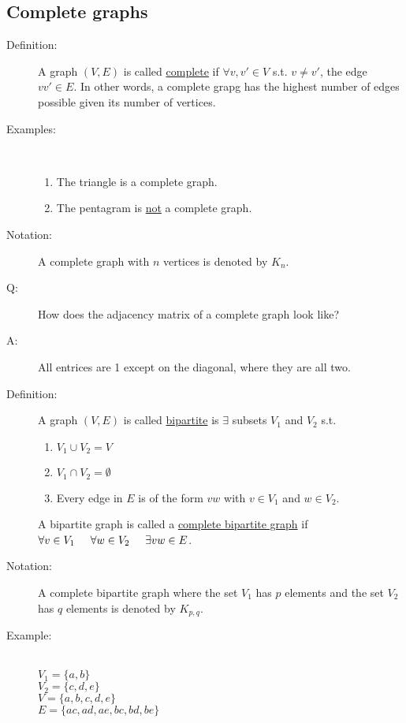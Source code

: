 \documentclass[10pt]{article}
\begin{document}
	\subsection{Complete graphs}
	\begin{description}
		\item[Definition:] A graph $(V, E)$ is called \underline{complete} if $\forall v, v' \in V$ s.t. $v \neq v'$, the edge $vv' \in E$. In other words, a complete grapg has the highest number of edges possible given its number of vertices.
		\item[Examples:] ~\\
		\begin{enumerate}
			\item The triangle is a complete graph.
			\item The pentagram is \underline{not} a complete graph.
		\end{enumerate}
		\item[Notation:] A complete graph with $n$ vertices is denoted by $K_n$.
		\item[Q:] How does the adjacency matrix of a complete graph look like?
		\item[A:] All entrices are 1 except on the diagonal, where they are all two.
		\item[Definition:] A graph $(V, E)$ is called \underline{bipartite} is $\exists$ subsets $V_1$ and $V_2$ s.t.
		\begin{enumerate}
			\item $V_1 \cup V_2 = V$
			\item $V_1 \cap V_2 = \emptyset$
			\item Every edge in $E$ is of the form $vw$ with $v \in V_1$ and $w \in V_2$.
		\end{enumerate}
		A bipartite graph is called a \underline{complete bipartite graph} if $\forall v \in V_1 \hspace{5mm} \forall w \in V_2 \hspace{5mm} \exists vw \in E$.
		\item[Notation:] A complete bipartite graph where the set $V_1$ has $p$ elements and the set $V_2$ has $q$ elements is denoted by $K_{p,q}$.
		\item[Example:] ~\\
		$V_1 = \{a, b\}$ \\
		$V_2 = \{c, d, e\}$ \\
		$V = \{a, b, c, d, e\}$ \\
		$E = \{ac, ad, ae, bc, bd, be\}$ \\
		\pagebreak
		\begin{figure}[h!]
			\centering
\end{figure}
\end{description}
\end{document}

